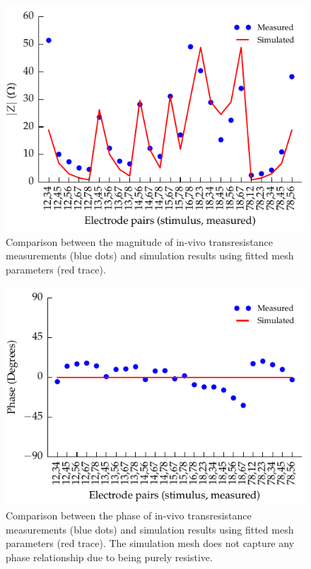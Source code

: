 \documentclass[journal, a4paper]{IEEEtran}
\begin{document}
\begin{figure}
    \begin{center}
        \includegraphics{graphics/sheep_transimpedance_doubleFit_mag}
    \end{center}
    \caption{Comparison between the magnitude of in-vivo transresistance measurements (blue dots) and simulation results using fitted mesh parameters (red trace).}
    \label{fig:transimpedance_sheep_mag}
\end{figure}

\begin{figure}
    \begin{center}
        \includegraphics{graphics/sheep_transimpedance_doubleFit_phase}
    \end{center}
    \caption{Comparison between the phase of in-vivo transresistance measurements (blue dots) and simulation results using fitted mesh parameters (red trace). The simulation mesh does not capture any phase relationship due to being purely resistive.}
    \label{fig:transimpedance_sheep_phase}
\end{figure}
\end{document}
